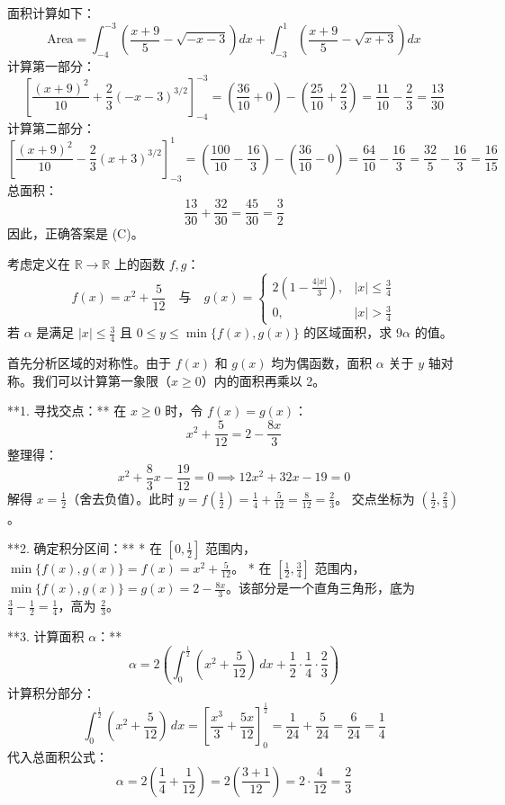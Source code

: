 \begin{questions}
\begin{solution}
面积计算如下：
\[
\text{Area} = \int_{-4}^{-3} \left( \frac{x+9}{5} - \sqrt{-x-3} \right) dx + \int_{-3}^{1} \left( \frac{x+9}{5} - \sqrt{x+3} \right) dx
\]
计算第一部分：
\[
\left[ \frac{(x+9)^2}{10} + \frac{2}{3}(-x-3)^{3/2} \right]_{-4}^{-3} = \left( \frac{36}{10} + 0 \right) - \left( \frac{25}{10} + \frac{2}{3} \right) = \frac{11}{10} - \frac{2}{3} = \frac{13}{30}
\]
计算第二部分：
\[
\left[ \frac{(x+9)^2}{10} - \frac{2}{3}(x+3)^{3/2} \right]_{-3}^{1} = \left( \frac{100}{10} - \frac{16}{3} \right) - \left( \frac{36}{10} - 0 \right) = \frac{64}{10} - \frac{16}{3} = \frac{32}{5} - \frac{16}{3} = \frac{16}{15}
\]
总面积：
\[
\frac{13}{30} + \frac{32}{30} = \frac{45}{30} = \frac{3}{2}
\]
因此，正确答案是 (C)。
\end{solution}
    \question
考虑定义在 $\mathbb{R} \to \mathbb{R}$ 上的函数 $f, g$：
\[
f(x) = x^2 + \frac{5}{12} \quad \text{与} \quad g(x) = 
\begin{cases} 
2\left(1 - \frac{4|x|}{3}\right), & |x| \le \frac{3}{4} \\
0, & |x| > \frac{3}{4} 
\end{cases}
\]
若 $\alpha$ 是满足 $|x| \le \frac{3}{4}$ 且 $0 \le y \le \min\{f(x), g(x)\}$ 的区域面积，求 $9\alpha$ 的值。

\begin{solution}
首先分析区域的对称性。由于 $f(x)$ 和 $g(x)$ 均为偶函数，面积 $\alpha$ 关于 $y$ 轴对称。我们可以计算第一象限（$x \ge 0$）内的面积再乘以 2。

**1. 寻找交点：**
在 $x \ge 0$ 时，令 $f(x) = g(x)$：
\[
x^2 + \frac{5}{12} = 2 - \frac{8x}{3}
\]
整理得：
\[
x^2 + \frac{8}{3}x - \frac{19}{12} = 0 \implies 12x^2 + 32x - 19 = 0
\]
解得 $x = \frac{1}{2}$（舍去负值）。此时 $y = f\left(\frac{1}{2}\right) = \frac{1}{4} + \frac{5}{12} = \frac{8}{12} = \frac{2}{3}$。
交点坐标为 $(\frac{1}{2}, \frac{2}{3})$。

**2. 确定积分区间：**
* 在 $[0, \frac{1}{2}]$ 范围内，$\min\{f(x), g(x)\} = f(x) = x^2 + \frac{5}{12}$。
* 在 $[\frac{1}{2}, \frac{3}{4}]$ 范围内，$\min\{f(x), g(x)\} = g(x) = 2 - \frac{8x}{3}$。该部分是一个直角三角形，底为 $\frac{3}{4} - \frac{1}{2} = \frac{1}{4}$，高为 $\frac{2}{3}$。

**3. 计算面积 $\alpha$：**
\[
\alpha = 2 \left( \int_{0}^{\frac{1}{2}} (x^2 + \frac{5}{12}) \,dx + \frac{1}{2} \cdot \frac{1}{4} \cdot \frac{2}{3} \right)
\]
计算积分部分：
\[
\int_{0}^{\frac{1}{2}} (x^2 + \frac{5}{12}) \,dx = \left[ \frac{x^3}{3} + \frac{5x}{12} \right]_{0}^{\frac{1}{2}} = \frac{1}{24} + \frac{5}{24} = \frac{6}{24} = \frac{1}{4}
\]
代入总面积公式：
\[
\alpha = 2 \left( \frac{1}{4} + \frac{1}{12} \right) = 2 \left( \frac{3+1}{12} \right) = 2 \cdot \frac{4}{12} = \frac{2}{3}
\]


\end{solution}
\end{questions}
